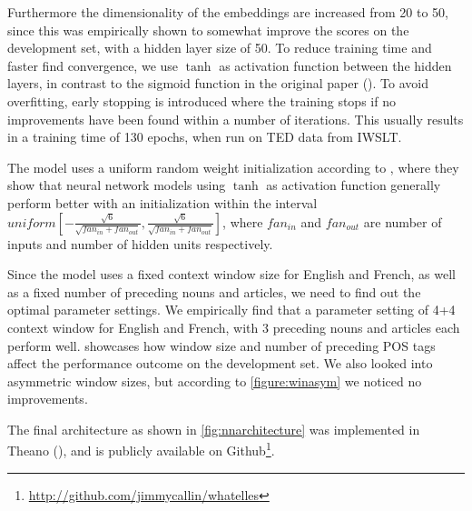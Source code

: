 \documentclass[11pt]{article}
\begin{document}
Furthermore the dimensionality of the embeddings are increased from 20 to 50, since this was empirically shown to somewhat improve the scores on the development set, with a hidden layer size of 50.
To reduce training time and faster find convergence, we use $\tanh$ as activation function between the hidden layers, in contrast to the sigmoid function in the original paper (\cite{Lecun2012Efficient}).
To avoid overfitting, early stopping is introduced where the training stops if no improvements have been found within a number of iterations.
This usually results in a training time of 130 epochs, when run on TED data from IWSLT.

The model uses a uniform random weight initialization according to \textcite{Glorot2010Understanding}, where they show that neural network models using $\tanh$ as activation function generally perform better with an initialization within the interval $uniform[-\frac{\sqrt{6}}{\sqrt{fan_{in}+fan_{out}}},\frac{\sqrt{6}}{\sqrt{fan_{in}+fan_{out}}}]$, where $fan_{in}$ and $fan_{out}$ are number of inputs and number of hidden units respectively.

Since the model uses a fixed context window size for English and French, as well as a fixed number of preceding nouns and articles, we need to find out the optimal parameter settings. We empirically find that a parameter setting of 4+4 context window for English and French, with 3 preceding nouns and articles each perform well.  showcases how window size and number of preceding POS tags affect the performance outcome on the development set. We also looked into asymmetric window sizes, but according to \cref{figure:winasym} we noticed no improvements.

The final architecture as shown in \cref{fig:nnarchitecture} was implemented in Theano (\cite{Bergstra2010Theano}), and is publicly available on Github\footnote{\url{http://github.com/jimmycallin/whatelles}}.
\end{document}
